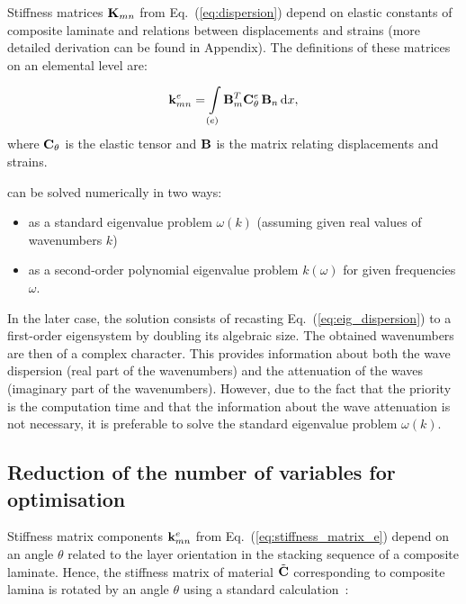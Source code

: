 	Stiffness matrices \(\mathbf{K}_{mn}\) from Eq.~(\ref{eq:dispersion}) depend on elastic 
	constants of composite laminate and relations between displacements and strains 
	(more detailed derivation can be found in Appendix). The definitions of these matrices 
	on an elemental level are:
	
	
\begin{equation}
	\mathbf{k}_{mn}^e= \int \limits_{(e)} \mathbf{B}_m^{T} \mathbf{C}_{\theta}^e \, \mathbf{B}_n\, \mathrm{d} x, 
\label{eq:stiffness_matrix_e}\end{equation}
	where \(\mathbf{C}_{\theta}\) is the elastic tensor and \(\mathbf{B}\) is the matrix relating 
	displacements and strains.
	
	
	 can be solved numerically in two ways:
	\begin{itemize}
		\item as a standard eigenvalue problem \(\omega (k)\) (assuming given real values 
		of wavenumbers \(k\))
		\item as a second-order polynomial eigenvalue problem \(k(\omega)\) for given 
		frequencies \(\omega\).
	\end{itemize}
In the later case, the solution consists of recasting Eq.~(\ref{eq:eig_dispersion}) to a 
first-order eigensystem by doubling its algebraic size.  The obtained wavenumbers are 
then of a complex character. This provides information about both the wave dispersion 
(real part of the wavenumbers) and the attenuation of the waves (imaginary part of the 
wavenumbers).  However, due to the fact that the priority is the computation time and 
that the information about the wave attenuation is not necessary, it is preferable to 
solve the standard eigenvalue problem \(\omega (k)\).
 
\subsection{Reduction of the number of variables for optimisation}
  Stiffness matrix components \(\mathbf{k}_{mn}^e\) from 
 Eq.~(\ref{eq:stiffness_matrix_e}) 
 depend on an angle \(\theta\) related to the layer orientation in the stacking sequence 
 of 
 a composite laminate. Hence, the stiffness matrix of material \(\tilde{\mathbf{C}}\) 
 corresponding to composite lamina is rotated by an angle \(\theta\) using a standard 
 calculation~\cite{Bartoli2006,Taupin2011}:
 
